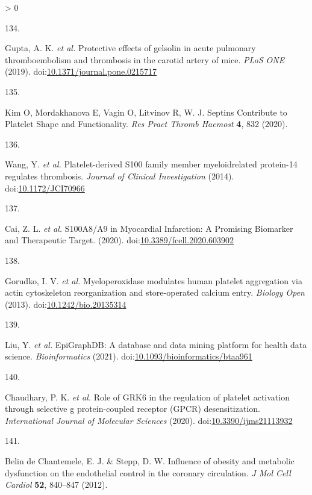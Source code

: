 \documentclass[11pt,twoside]{bristolthesis}
\newlength{\cslhangindent}
\newlength{\csllabelwidth}
\newenvironment{CSLReferences}[2] %
 {%
  \setlength{\parindent}{0pt}
  \ifodd #1 \everypar{\setlength{\hangindent}{\cslhangindent}}\ignorespaces\fi
  \ifnum #2 > 0
  \setlength{\parskip}{#2\baselineskip}
  \fi
 }%
 {}
\newcommand{\CSLLeftMargin}[1]{\parbox[t]{\csllabelwidth}{#1}}
\newcommand{\CSLRightInline}[1]{\parbox[t]{\linewidth - \csllabelwidth}{#1}\break}
\begin{document}
\begin{CSLReferences}{0}{0}
\leavevmode\hypertarget{ref-Gupta2019}{}%
\CSLLeftMargin{134. }
\CSLRightInline{Gupta, A. K. \emph{et al.} {Protective effects of gelsolin in acute pulmonary thromboembolism and thrombosis in the carotid artery of mice}. \emph{PLoS ONE} (2019). doi:\href{https://doi.org/10.1371/journal.pone.0215717}{10.1371/journal.pone.0215717}}

\leavevmode\hypertarget{ref-Kim2020}{}%
\CSLLeftMargin{135. }
\CSLRightInline{Kim O, Mordakhanova E, Vagin O, Litvinov R, W. J. {Septins Contribute to Platelet Shape and Functionality}. \emph{Res Pract Thromb Haemost} \textbf{4}, 832 (2020).}

\leavevmode\hypertarget{ref-Wang2014a}{}%
\CSLLeftMargin{136. }
\CSLRightInline{Wang, Y. \emph{et al.} {Platelet-derived S100 family member myeloidrelated protein-14 regulates thrombosis}. \emph{Journal of Clinical Investigation} (2014). doi:\href{https://doi.org/10.1172/JCI70966}{10.1172/JCI70966}}

\leavevmode\hypertarget{ref-Cai2020}{}%
\CSLLeftMargin{137. }
\CSLRightInline{Cai, Z. L. \emph{et al.} {S100A8/A9 in Myocardial Infarction: A Promising Biomarker and Therapeutic Target}. (2020). doi:\href{https://doi.org/10.3389/fcell.2020.603902}{10.3389/fcell.2020.603902}}

\leavevmode\hypertarget{ref-Gorudko2013}{}%
\CSLLeftMargin{138. }
\CSLRightInline{Gorudko, I. V. \emph{et al.} {Myeloperoxidase modulates human platelet aggregation via actin cytoskeleton reorganization and store-operated calcium entry}. \emph{Biology Open} (2013). doi:\href{https://doi.org/10.1242/bio.20135314}{10.1242/bio.20135314}}

\leavevmode\hypertarget{ref-Liu2021}{}%
\CSLLeftMargin{139. }
\CSLRightInline{Liu, Y. \emph{et al.} {EpiGraphDB: A database and data mining platform for health data science}. \emph{Bioinformatics} (2021). doi:\href{https://doi.org/10.1093/bioinformatics/btaa961}{10.1093/bioinformatics/btaa961}}

\leavevmode\hypertarget{ref-Chaudhary2020}{}%
\CSLLeftMargin{140. }
\CSLRightInline{Chaudhary, P. K. \emph{et al.} {Role of GRK6 in the regulation of platelet activation through selective g protein-coupled receptor (GPCR) desensitization}. \emph{International Journal of Molecular Sciences} (2020). doi:\href{https://doi.org/10.3390/ijms21113932}{10.3390/ijms21113932}}

\leavevmode\hypertarget{ref-BelindeChantemele2012a}{}%
\CSLLeftMargin{141. }
\CSLRightInline{Belin de Chantemele, E. J. \& Stepp, D. W. {Influence of obesity and metabolic dysfunction on the endothelial control in the coronary circulation}. \emph{J Mol Cell Cardiol} \textbf{52}, 840--847 (2012).}


\end{CSLReferences}
\end{document}
